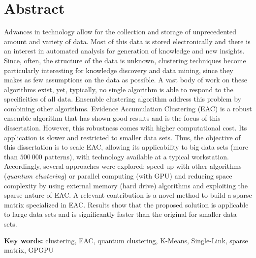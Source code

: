 
\section*{Abstract}


Advances in technology allow for the collection and storage of unprecedented amount and variety of data.
Most of this data is stored electronically and there is an interest in automated analysis for generation of knowledge and new insights.
Since, often, the structure of the data is unknown, clustering techniques become particularly interesting for knowledge discovery and data mining, since they makes as few assumptions on the data as possible.
A vast body of work on these algorithms exist, yet, typically, no single algorithm is able to respond to the specificities of all data.
Ensemble clustering algorithm address this problem by combining other algorithms.
Evidence Accumulation Clustering (EAC) is a robust ensemble algorithm that has shown good results and is the focus of this dissertation.
However, this robustness comes with higher computational cost.
Its application is slower and restricted to smaller data sets.
Thus, the objective of this dissertation is to scale EAC, allowing its applicability to big data sets (more than $500 \: 000$ patterns), with technology available at a typical workstation.
Accordingly, several approaches were explored: speed-up with other algorithms (\emph{quantum clustering}) or parallel computing (with GPU) and reducing space complexity by using external memory (hard drive) algorithms and exploiting the sparse nature of EAC.
A relevant contribution is a novel method to build a sparse matrix specialized in EAC.
Results show that the proposed solution is applicable to large data sets and is significantly faster than the original for smaller data sets.

\vfill

\textbf{\Large Key words:} clustering, EAC, quantum clustering, K-Means, Single-Link, sparse matrix, GPGPU

\cleardoublepage

